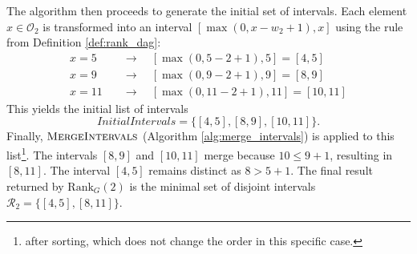 The algorithm then proceeds to generate the initial set of intervals. Each element $x \in \mathcal{O}_2$ is transformed into an interval $[\max(0, x - w_2 + 1), x]$ using the rule from Definition \ref{def:rank_dag}:
\begin{align*}
    x=5 \quad  & \longrightarrow \quad [\max(0, 5 - 2 + 1), 5] = [4, 5]     \\
    x=9 \quad  & \longrightarrow \quad [\max(0, 9 - 2 + 1), 9] = [8, 9]     \\
    x=11 \quad & \longrightarrow \quad [\max(0, 11 - 2 + 1), 11] = [10, 11]
\end{align*}
This yields the initial list of intervals
\[InitialIntervals = \{ [4, 5], [8, 9], [10, 11] \}.\]
Finally, $\textsc{MergeIntervals}$ (Algorithm \ref{alg:merge_intervals}) is applied to this list\footnote{after sorting, which does not change the order in this specific case.}. The intervals $[8, 9]$ and $[10, 11]$ merge because $10 \le 9+1$, resulting in $[8, 11]$. The interval $[4, 5]$ remains distinct as $8 > 5+1$. The final result returned by $\mathrm{Rank}_G(2)$ is the minimal set of disjoint intervals $\mathcal{R}_2 = \{ [4, 5], [8, 11] \}$.
